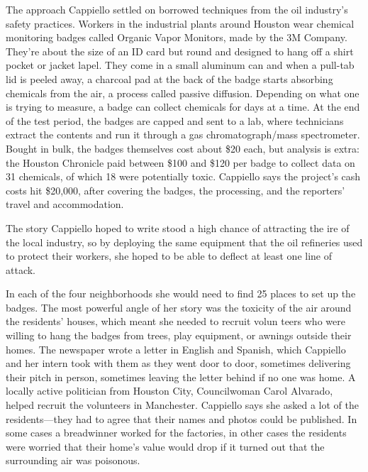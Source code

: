 The approach Cappiello settled on borrowed techniques from the oil industry's
safety practices. Workers in the industrial plants around Houston wear
chemical monitoring badges called Organic Vapor Monitors, made by the
3M Company. They're about the size of an ID card but round and designed
to hang off a shirt pocket or jacket lapel. They come in a small aluminum
can and when a pull-tab lid is peeled away, a charcoal pad at the back of
the badge starts absorbing chemicals from the air, a process called passive
diffusion. Depending on what one is trying to measure, a badge can collect
chemicals for days at a time. At the end of the test period, the badges
are capped and sent to a lab, where technicians extract the contents and
run it through a gas chromatograph/mass spectrometer. Bought in bulk,
the badges themselves cost about \$20 each, but analysis is extra: the Houston
Chronicle paid between \$100 and \$120 per badge to collect data on 31
chemicals, of which 18 were potentially toxic. Cappiello says the project's
cash costs hit \$20,000, after covering the badges, the processing, and the
reporters' travel and accommodation.

The story Cappiello hoped to write stood a high chance of attracting the
ire of the local industry, so by deploying the same equipment that the oil
refineries used to protect their workers, she hoped to be able to deflect at
least one line of attack.

In each of the four neighborhoods she would need to find 25 places to set
up the badges. The most powerful angle of her story was the toxicity of the
air around the residents' houses, which meant she needed to recruit volun
teers who were willing to hang the badges from trees, play equipment, or
awnings outside their homes. The newspaper wrote a letter in English and
Spanish, which Cappiello and her intern took with them as they went door
to door, sometimes delivering their pitch in person, sometimes leaving the
letter behind if no one was home. A locally active politician from Houston
City, Councilwoman Carol Alvarado, helped recruit the volunteers in Manchester.
Cappiello says she asked a lot of the residents—they had to agree
that their names and photos could be published. In some cases a breadwinner
worked for the factories, in other cases the residents were worried
that their home's value would drop if it turned out that the surrounding air
was poisonous.

